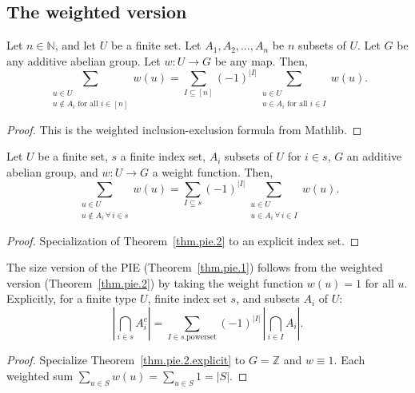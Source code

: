 \subsection{The weighted version}

\begin{theorem}
\label{thm.pie.2}
\leantarget
\leanok
Let $n \in \mathbb{N}$, and let $U$ be a finite set. Let $A_1, A_2, \ldots, A_n$
be $n$ subsets of $U$. Let $G$ be any additive abelian group. Let $w\colon U \to G$
be any map. Then,
\[
\sum_{\substack{u \in U \\ u \notin A_i \text{ for all } i \in [n]}} w(u)
= \sum_{I \subseteq [n]} (-1)^{|I|} \sum_{\substack{u \in U \\ u \in A_i \text{ for all } i \in I}} w(u).
\]
\end{theorem}

\begin{proof}
This is the weighted inclusion-exclusion formula from Mathlib.
\end{proof}

\begin{theorem}
\label{thm.pie.2.explicit}
\leanhelper
\leanok
Let $U$ be a finite set, $s$ a finite index set, $A_i$ subsets of $U$ for $i \in s$,
$G$ an additive abelian group, and $w\colon U \to G$ a weight function. Then,
\[
\sum_{\substack{u \in U \\ u \notin A_i\ \forall\, i \in s}} w(u)
= \sum_{I \subseteq s} (-1)^{|I|} \sum_{\substack{u \in U \\ u \in A_i\ \forall\, i \in I}} w(u).
\]
\end{theorem}

\begin{proof}
Specialization of Theorem~\ref{thm.pie.2} to an explicit index set.
\end{proof}

\begin{lemma}
\label{lem.pie.size-from-weighted}
\leanhelper
\leanok
The size version of the PIE (Theorem~\ref{thm.pie.1}) follows from the weighted version
(Theorem~\ref{thm.pie.2}) by taking the weight function $w(u) = 1$ for all $u$.
Explicitly, for a finite type $U$, finite index set $s$, and subsets $A_i$ of $U$:
\[
\left|\bigcap_{i \in s} A_i^c\right|
= \sum_{I \in s.\mathrm{powerset}} (-1)^{|I|}\, \left|\bigcap_{i \in I} A_i\right|.
\]
\end{lemma}

\begin{proof}
Specialize Theorem~\ref{thm.pie.2.explicit} to $G = \mathbb{Z}$ and $w \equiv 1$.
Each weighted sum $\sum_{u \in S} w(u) = \sum_{u \in S} 1 = |S|$.
\end{proof}
